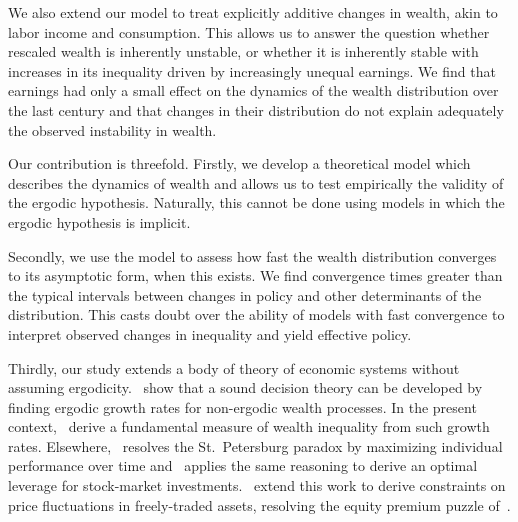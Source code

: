 We also extend our model to treat explicitly additive changes in wealth, akin to labor income and consumption. This allows us to answer the question whether rescaled wealth is inherently unstable, or whether it is inherently stable with increases in its inequality driven by increasingly unequal earnings. We find that earnings had only a small effect on the dynamics of the wealth distribution over the last century
and that changes in their distribution do not explain adequately the observed instability in wealth.

Our contribution is threefold. Firstly, we develop a theoretical model which describes the dynamics of wealth and allows us to test empirically the validity of the ergodic hypothesis. Naturally, this cannot be done using models in which the ergodic hypothesis is implicit.

Secondly, we use the model to assess how fast the wealth distribution converges to its asymptotic form, when this exists. We find convergence times greater than the typical intervals between changes in policy and other determinants of the distribution. This casts doubt over the ability of models with fast convergence to interpret observed changes in inequality and yield effective policy.


Thirdly, our study extends a body of theory of economic systems without assuming ergodicity.~\cite{PetersGell-Mann2016} show that a sound decision theory can be developed by finding ergodic growth rates for non-ergodic wealth processes. In the present context,~\cite{AdamouPeters2016} derive a fundamental measure of wealth inequality from such growth rates. Elsewhere,~\cite{Peters2011b} resolves the St.~Petersburg paradox by maximizing individual performance over time and~\cite{Peters2011a} applies the same reasoning to derive an optimal leverage for stock-market investments.~\cite{PetersAdamou2013} extend this work to derive constraints on price fluctuations in freely-traded assets, resolving the equity premium puzzle of~\cite{MehraPrescott1985}.

